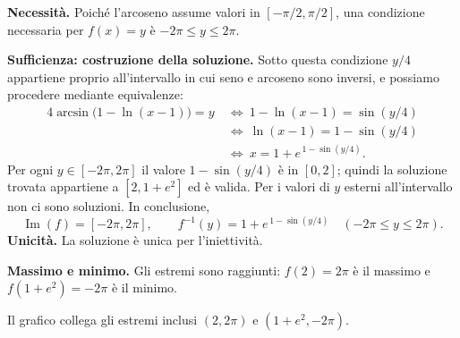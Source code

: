 \begin{svolgimento}
\textbf{Necessità.} Poiché l'arcoseno assume valori in $[-\pi/2,\pi/2]$, una condizione necessaria per $f(x)=y$ è $-2\pi\le y\le2\pi$.

\textbf{Sufficienza: costruzione della soluzione.} Sotto questa condizione $y/4$ appartiene proprio all'intervallo in cui seno e arcoseno sono inversi, e possiamo procedere mediante equivalenze:
\begin{align*}
4\arcsin\!\bigl(1-\ln(x-1)\bigr)=y
&\ \Longleftrightarrow\ 1-\ln(x-1)=\sin(y/4)\\
&\ \Longleftrightarrow\ \ln(x-1)=1-\sin(y/4)\\
&\ \Longleftrightarrow\ x=1+e^{\,1-\sin(y/4)}.
\end{align*}
Per ogni $y\in[-2\pi,2\pi]$ il valore $1-\sin(y/4)$ è in $[0,2]$; quindi la soluzione trovata appartiene a $[2,1+e^2]$ ed è valida. Per i valori di $y$ esterni all'intervallo non ci sono soluzioni. In conclusione,
\[
\operatorname{Im}(f)=[-2\pi,2\pi],\qquad
f^{-1}(y)=1+e^{\,1-\sin(y/4)}\quad(-2\pi\le y\le2\pi).
\]
\textbf{Unicità.} La soluzione è unica per l'iniettività.

\textbf{Massimo e minimo.} Gli estremi sono raggiunti: $f(2)=2\pi$ è il massimo e $f(1+e^2)=-2\pi$ è il minimo.
\end{svolgimento}

\begin{schema}

Il grafico collega gli estremi inclusi $(2,2\pi)$ e $(1+e^2,-2\pi)$.
\end{schema}
